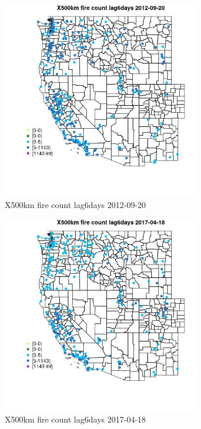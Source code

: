 \begin{figure} 
\centering  
\includegraphics[width=0.77\textwidth]{Code_Outputs/Report_ML_input_PM25_Step4_part_e_de_duplicated_aves_compiled_2019-05-14wNAs_MapObsX500km_fire_count_lag6days2012-09-20.jpg} 
\caption{\label{fig:Report_ML_input_PM25_Step4_part_e_de_duplicated_aves_compiled_2019-05-14wNAsMapObsX500km_fire_count_lag6days2012-09-20}X500km fire count lag6days 2012-09-20} 
\end{figure} 
 

\begin{figure} 
\centering  
\includegraphics[width=0.77\textwidth]{Code_Outputs/Report_ML_input_PM25_Step4_part_e_de_duplicated_aves_compiled_2019-05-14wNAs_MapObsX500km_fire_count_lag6days2017-04-18.jpg} 
\caption{\label{fig:Report_ML_input_PM25_Step4_part_e_de_duplicated_aves_compiled_2019-05-14wNAsMapObsX500km_fire_count_lag6days2017-04-18}X500km fire count lag6days 2017-04-18} 
\end{figure} 
 

